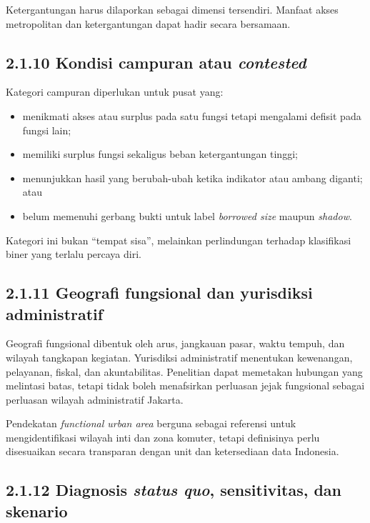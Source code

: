 \documentclass[
  indonesian,
  11pt,
  a4paper,
  oneside,
  openany]{report}
\providecommand{\tightlist}{%
  \setlength{\itemsep}{0pt}\setlength{\parskip}{0pt}}
\begin{document}
Ketergantungan harus dilaporkan sebagai dimensi tersendiri. Manfaat
akses metropolitan dan ketergantungan dapat hadir secara bersamaan.

\subsection{\texorpdfstring{2.1.10 Kondisi campuran atau
\emph{contested}}{2.1.10 Kondisi campuran atau contested}}\label{kondisi-campuran-atau-contested}

Kategori campuran diperlukan untuk pusat yang:

\begin{itemize}
\tightlist
\item
  menikmati akses atau surplus pada satu fungsi tetapi mengalami defisit
  pada fungsi lain;
\item
  memiliki surplus fungsi sekaligus beban ketergantungan tinggi;
\item
  menunjukkan hasil yang berubah-ubah ketika indikator atau ambang
  diganti; atau
\item
  belum memenuhi gerbang bukti untuk label \emph{borrowed size} maupun
  \emph{shadow}.
\end{itemize}

Kategori ini bukan ``tempat sisa'', melainkan perlindungan terhadap
klasifikasi biner yang terlalu percaya diri.

\subsection{2.1.11 Geografi fungsional dan yurisdiksi
administratif}\label{geografi-fungsional-dan-yurisdiksi-administratif}

Geografi fungsional dibentuk oleh arus, jangkauan pasar, waktu tempuh,
dan wilayah tangkapan kegiatan. Yurisdiksi administratif menentukan
kewenangan, pelayanan, fiskal, dan akuntabilitas. Penelitian dapat
memetakan hubungan yang melintasi batas, tetapi tidak boleh menafsirkan
perluasan jejak fungsional sebagai perluasan wilayah administratif
Jakarta.

Pendekatan \emph{functional urban area} berguna sebagai referensi untuk
mengidentifikasi wilayah inti dan zona komuter, tetapi definisinya perlu
disesuaikan secara transparan dengan unit dan ketersediaan data
Indonesia.

\subsection{\texorpdfstring{2.1.12 Diagnosis \emph{status quo},
sensitivitas, dan
skenario}{2.1.12 Diagnosis status quo, sensitivitas, dan skenario}}\label{diagnosis-status-quo-sensitivitas-dan-skenario}
\end{document}
